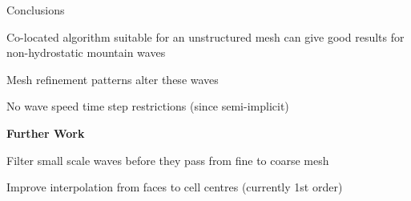 \begin{slide}{Conclusions}

\begin{list0}

\item Co-located algorithm suitable for an unstructured mesh can give good results for non-hydrostatic mountain waves

\item Mesh refinement patterns alter these waves

\item No wave speed time step restrictions (since semi-implicit)

\end{list0}

\begin{center}\Large\bfseries Further Work \end{center}

\begin{list0}

\item Filter small scale waves before they pass from fine to coarse mesh

\item Improve interpolation from faces to cell centres (currently 1st order)

\end{list0}

\end{slide}
